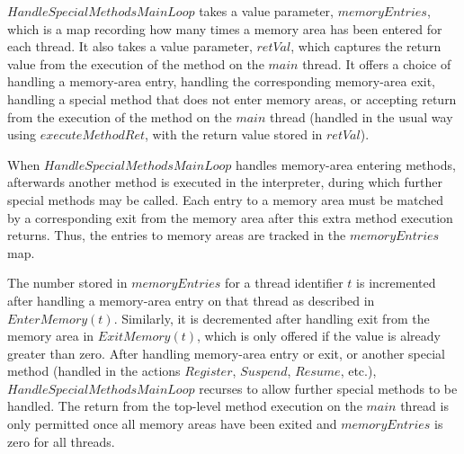 $HandleSpecialMethodsMainLoop$ takes a value parameter,
$memoryEntries$, which is a map recording how many times a memory area
has been entered for each thread.
It also takes a value parameter, $retVal$, which captures the return
value from the execution of the method on the $main$ thread.
It offers a choice of handling a memory-area entry, handling the
corresponding memory-area exit, handling a special method that does
not enter memory areas, or accepting return from the execution of the
method on the $main$ thread (handled in the usual way using
$executeMethodRet$, with the return value stored in $retVal$).

When $HandleSpecialMethodsMainLoop$ handles memory-area entering
methods, afterwards another method is executed in the interpreter,
during which further special methods may be called.
Each entry to a memory area must be matched by a corresponding exit
from the memory area after this extra method execution returns.
Thus, the entries to memory areas are tracked in the $memoryEntries$
map.

The number stored in $memoryEntries$ for a thread identifier $t$ is
incremented after handling a memory-area entry on that thread as
described in $EnterMemory(t)$.
Similarly, it is decremented after handling exit from the memory area
in $ExitMemory(t)$, which is only offered if the value is already
greater than zero.
After handling memory-area entry or exit, or another special method
(handled in the actions $Register$, $Suspend$, $Resume$, etc.),
$HandleSpecialMethodsMainLoop$ recurses to allow further special
methods to be handled.
The return from the top-level method execution on the $main$ thread is
only permitted once all memory areas have been exited and
$memoryEntries$ is zero for all threads.

